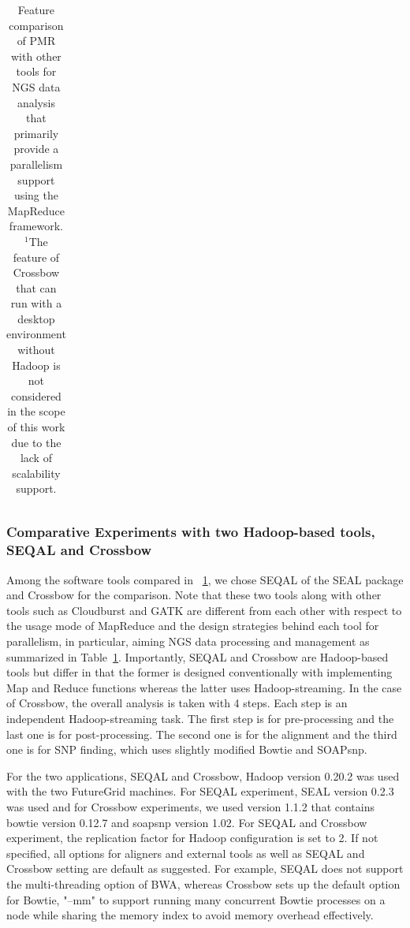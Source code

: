 \documentclass{acm_proc_article-sp}
\begin{document}
\begin{center}
\begin{table}[ht]
{\begin{tabular}{|l|l|c|c|c|c|c|c|}
\hline
\end{tabular}}
\hfill{}
\caption{Feature comparison of PMR with other tools for NGS data analysis that primarily provide a parallelism support using the MapReduce framework.  $^{1}${The feature of Crossbow that can run with a desktop environment without Hadoop is not considered in the scope of this work due to the lack of scalability support.} }
 \label{table:mr-comparison}
\end{table}
\end{center}

\subsubsection{Comparative Experiments with two Hadoop-based tools, SEQAL and Crossbow}
Among the software tools compared in ~\ref{table:mr-comparison}, we chose SEQAL of the SEAL package and Crossbow for the comparison.  Note that these two tools along with other tools such as Cloudburst and GATK are different from each other with respect to the usage mode of MapReduce and the design strategies behind each tool for parallelism, in particular, aiming NGS data processing and management as summarized in Table~\ref{table:mr-comparison}.  Importantly, SEQAL and Crossbow are Hadoop-based tools but differ in that the former is designed conventionally with implementing Map and Reduce functions whereas the latter uses Hadoop-streaming.  In the case of Crossbow, the overall analysis is taken with 4 steps.  Each step is an independent Hadoop-streaming task.  The first step is for pre-processing and the last one is for post-processing. The second one is for the alignment and the third one is for SNP finding, which uses slightly modified Bowtie and SOAPsnp.  

For the two applications, SEQAL and Crossbow, Hadoop version 0.20.2 was used with the two FutureGrid machines.  For SEQAL experiment, SEAL version 0.2.3 was used and for Crossbow experiments, we used version 1.1.2 that contains bowtie version 0.12.7 and soapsnp version 1.02.  For SEQAL and Crossbow experiment, the replication factor for Hadoop configuration is set  to 2.  If not specified, all options for aligners and external tools as well as SEQAL and Crossbow setting are default as suggested.  For example, SEQAL does not support the multi-threading option of BWA, whereas Crossbow sets up the default option for Bowtie, "--mm" to support running many concurrent Bowtie processes on a node while sharing the memory index to avoid memory overhead effectively.  
\end{document}
